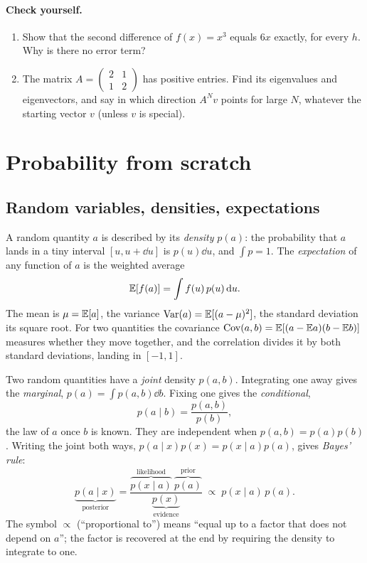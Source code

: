 \paragraph{Check yourself.}
\begin{enumerate}[label=\thesection.\arabic*,leftmargin=2.2em]
\item Show that the second difference of $f(x)=x^3$ equals $6x$ exactly, for every $h$. Why is there no error term?
\item The matrix $A=\begin{pmatrix}2&1\\1&2\end{pmatrix}$ has positive entries. Find its eigenvalues and eigenvectors, and say in which
  direction $A^Nv$ points for large $N$, whatever the starting vector $v$ (unless $v$ is special).
\end{enumerate}

\section{Probability from scratch}\label{sec:prob}

\subsection{Random variables, densities, expectations}

A random quantity $a$ is described by its \emph{density} $p(a)$: the probability that $a$ lands in a tiny
interval $[u,u+\dd u]$ is $p(u)\dd u$, and $\int p=1$. The \emph{expectation} of any function of $a$ is the
weighted average
\[
  \mathbb{E}[f(a)]=\int f(u)\,p(u)\,\mathrm{d} u .
\]
The mean is $\mu=\mathbb{E}[a]$, the variance $\operatorname{Var}(a)=\mathbb{E}[(a-\mu)^2]$, the standard deviation its square root. For two
quantities the covariance $\operatorname{Cov}(a,b)=\mathbb{E}[(a-\mathbb{E} a)(b-\mathbb{E} b)]$ measures whether they move together, and the
correlation divides it by both standard deviations, landing in $[-1,1]$.

Two random quantities have a \emph{joint} density $p(a,b)$. Integrating one away gives the \emph{marginal},
$p(a)=\int p(a,b)\dd b$. Fixing one gives the \emph{conditional},
\[
  p(a\mid b)=\frac{p(a,b)}{p(b)},
\]
the law of $a$ once $b$ is known. They are independent when $p(a,b)=p(a)p(b)$. Writing the joint both ways,
$p(a\mid x)p(x)=p(x\mid a)p(a)$, gives \emph{Bayes' rule}:
\begin{equation}\label{eq:bayes}
  \underbrace{p(a\mid x)}_{\text{posterior}}=\frac{\overbrace{p(x\mid a)}^{\text{likelihood}}\ \overbrace{p(a)}^{\text{prior}}}{\underbrace{p(x)}_{\text{evidence}}}
  \;\propto\;p(x\mid a)\,p(a).
\end{equation}
The symbol $\propto$ (``proportional to'') means ``equal up to a factor that does not depend on $a$''; the factor
is recovered at the end by requiring the density to integrate to one.

